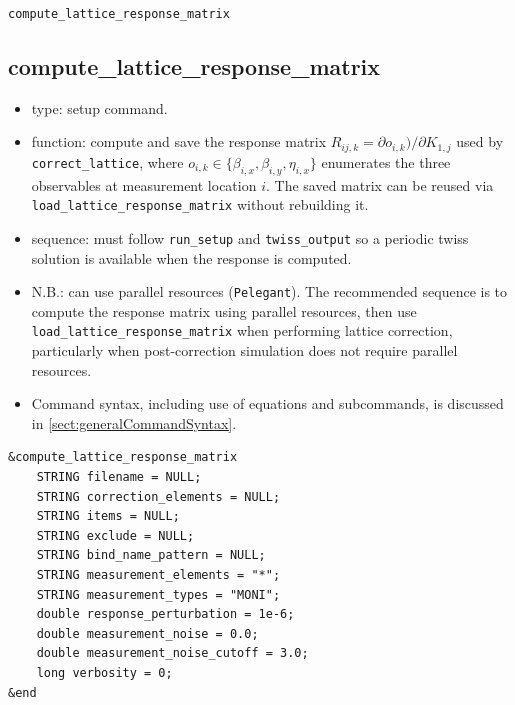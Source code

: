 \documentclass[11pt]{article}
\begin{document}
\newpage
\begin{center}{\Large\verb|compute_lattice_response_matrix|}\end{center}
\subsection{compute\_lattice\_response\_matrix \label{subsec:computelatticeresponsematrix}}

\begin{itemize}
\item type: setup command.
\item function: compute and save the response matrix
  $R_{ij,k} = \partial o_{i,k})/\partial K_{1,j}$ used by
  \verb|correct_lattice|, where $o_{i,k} \in \{\beta_{i,x}, \beta_{i,y}, \eta_{i,x}\}$
  enumerates the three observables at measurement location $i$.   The saved matrix
  can be reused via \verb|load_lattice_response_matrix| without
  rebuilding it.
\item sequence: must follow \verb|run_setup| and \verb|twiss_output|
  so a periodic twiss solution is available when the response is computed.
\item N.B.: can use parallel resources (\verb|Pelegant|).  The recommended sequence is to compute the response
  matrix using parallel resources, then use \verb|load_lattice_response_matrix| when performing lattice
  correction, particularly when post-correction simulation does not require parallel resources.
\item Command syntax, including use of equations and subcommands, is discussed in \ref{sect:generalCommandSyntax}.
\end{itemize}

\begin{verbatim}
&compute_lattice_response_matrix
    STRING filename = NULL;
    STRING correction_elements = NULL;
    STRING items = NULL;
    STRING exclude = NULL;
    STRING bind_name_pattern = NULL;
    STRING measurement_elements = "*";
    STRING measurement_types = "MONI";
    double response_perturbation = 1e-6;
    double measurement_noise = 0.0;
    double measurement_noise_cutoff = 3.0;
    long verbosity = 0;
&end
\end{verbatim}
\end{document}

